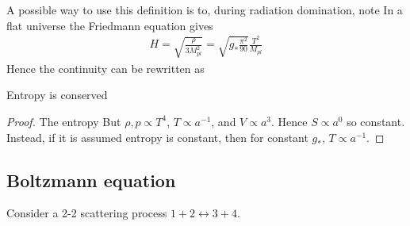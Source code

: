 \documentclass{article}
\begin{document}
\begin{example}
A possible way to use this definition is to, during radiation domination, note 
In a flat universe the Friedmann equation gives 
\begin{align}\label{eq:CSM:5}
H = \sqrt{\frac{\rho}{3 M_{pl}^2}} = \sqrt{g_\ast \frac{\pi^2}{90} } \frac{T^2}{M_{pl}}
\end{align}
Hence the continuity can be rewritten as 
\end{example}

\begin{prop}
Entropy is conserved
\end{prop}
\begin{proof}
The entropy 
But $\rho,p \propto T^4$, $T\propto a^{-1}$, and $V\propto a^3$. Hence $S \propto a^0$ so constant. Instead, if it is assumed entropy is constant, then for constant $g_\ast$, $T\propto a^{-1}$. 
\end{proof}

\subsection{Boltzmann equation}
Consider a 2-2 scattering process $1+2 \leftrightarrow 3+4$. 
\end{document}
